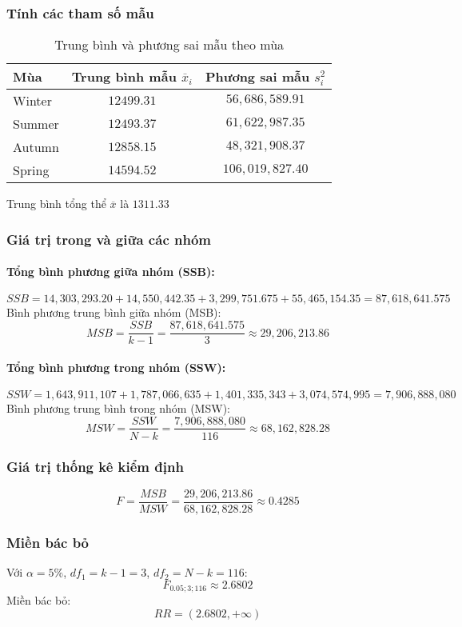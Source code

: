 \subsubsection{Tính các tham số mẫu}
\begin{table}[H]
\centering
\caption{Trung bình và phương sai mẫu theo mùa}
\begin{tabular}{lcc}
\hline
Mùa & Trung bình mẫu $\overline{x}_i$ & Phương sai mẫu $s_i^2$ \\ \hline
Winter  & $12499.31$ & $56,686,589.91$ \\
Summer  & $12493.37$ & $61,622,987.35$ \\
Autumn  & $12858.15$ & $48,321,908.37$ \\
Spring  & $14594.52$ & $106,019,827.40$ \\ \hline
\end{tabular}
\end{table}
Trung bình tổng thể \textbf{$\overline{x}$} là $1311.33$
\subsubsection{Giá trị trong và giữa các nhóm}

\paragraph{Tổng bình phương giữa nhóm (SSB):}
\[
SSB = 14,303,293.20 + 14,550,442.35 + 3,299,751.675 + 55,465,154.35 = 87,618,641.575
\]
Bình phương trung bình giữa nhóm (MSB):
\[
MSB = \frac{SSB}{k-1} = \frac{87,618,641.575}{3} \approx 29,206,213.86
\]

\paragraph{Tổng bình phương trong nhóm (SSW):}
\[
SSW = 1,643,911,107 + 1,787,066,635 + 1,401,335,343 + 3,074,574,995 = 7,906,888,080
\]
Bình phương trung bình trong nhóm (MSW):
\[
MSW = \frac{SSW}{N-k} = \frac{7,906,888,080}{116} \approx 68,162,828.28
\]

\subsubsection{Giá trị thống kê kiểm định}
\[
F = \frac{MSB}{MSW} = \frac{29,206,213.86}{68,162,828.28} \approx 0.4285
\]

\subsubsection{Miền bác bỏ}
Với $\alpha = 5\%$, $df_1 = k-1 = 3$, $df_2 = N-k = 116$:
\[
F_{0.05; 3; 116} \approx 2.6802
\]
Miền bác bỏ:
\[
RR = (2.6802, +\infty)
\]

